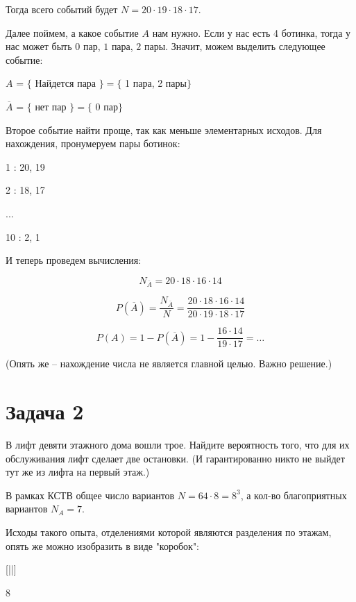 \documentclass{article}
\begin{document}
Тогда всего событий будет $N = 20 \cdot 19 \cdot 18 \cdot 17$.

Далее поймем, а какое событие $A$ нам нужно. Если у нас есть 4 ботинка, тогда у нас может быть $0$ пар, $1$ пара, $2$ пары. Значит, можем выделить следующее событие:

\begin{center}
  $A$ = $\{$ Найдется пара $\} = \{$ 1 пара, 2 пары$\}$

  $\overline{A}$ = $\{$ нет пар $\} = \{$ 0 пар$\}$
\end{center}

Второе событие найти проще, так как меньше элементарных исходов. Для нахождения, пронумеруем пары ботинок:

\quad

1 : 20, 19

2 : 18, 17

...

10 : 2,  1

\quad

И теперь проведем вычисления:

$$N_{\overline{A}} = 20 \cdot 18 \cdot 16 \cdot 14$$

$$P(\overline{A}) = \frac{N_{\overline{A}}}{N} = \frac{20 \cdot 18 \cdot 16 \cdot 14}{20 \cdot 19 \cdot 18 \cdot 17}$$

$$P(A) = 1 - P(\overline{A}) = 1 - \frac{16 \cdot 14}{19 \cdot 17} = \ldots $$

\quad

(Опять же -- нахождение числа не является главной целью. Важно решение.)

\section{Задача 2}

В лифт девяти этажного дома вошли трое. Найдите вероятность того, что для их обслуживания лифт сделает две остановки. (И гарантированно никто не выйдет тут же из лифта на первый этаж.)

\quad

В рамках КСТВ общее число вариантов $N = 64 \cdot 8 = 8^3$, а кол-во благоприятных вариантов $N_A = 7$.

Исходы такого опыта, отделениями которой являются разделения по этажам, опять же можно изобразить в виде "коробок":

\begin{center}
  [\qquad|\qquad|\qquad]

     8  
\end{center}
\end{document}
